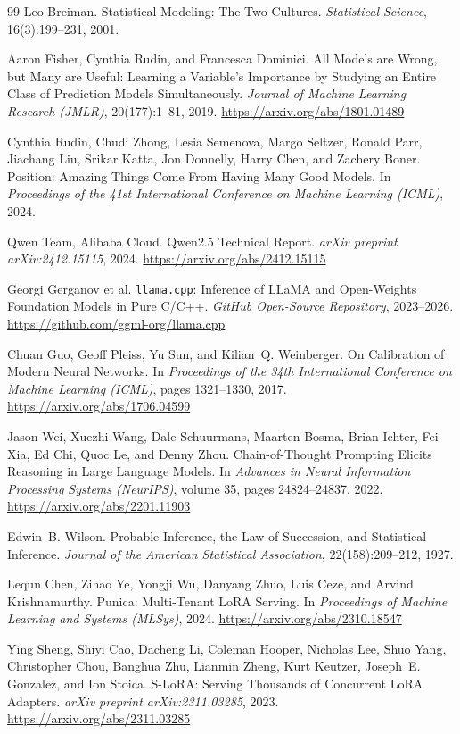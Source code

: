 \documentclass[10pt,a4paper]{article}
\begin{document}
\begin{thebibliography}{99}
Leo Breiman.
\newblock Statistical Modeling: The Two Cultures.
\newblock \emph{Statistical Science}, 16(3):199--231, 2001.

Aaron Fisher, Cynthia Rudin, and Francesca Dominici.
\newblock All Models are Wrong, but Many are Useful: Learning a Variable's Importance by Studying an Entire Class of Prediction Models Simultaneously.
\newblock \emph{Journal of Machine Learning Research (JMLR)}, 20(177):1--81, 2019. \url{https://arxiv.org/abs/1801.01489}

Cynthia Rudin, Chudi Zhong, Lesia Semenova, Margo Seltzer, Ronald Parr, Jiachang Liu, Srikar Katta, Jon Donnelly, Harry Chen, and Zachery Boner.
\newblock Position: Amazing Things Come From Having Many Good Models.
\newblock In \emph{Proceedings of the 41st International Conference on Machine Learning (ICML)}, 2024.

Qwen Team, Alibaba Cloud.
\newblock Qwen2.5 Technical Report.
\newblock \emph{arXiv preprint arXiv:2412.15115}, 2024. \url{https://arxiv.org/abs/2412.15115}

Georgi Gerganov et al.
\newblock \texttt{llama.cpp}: Inference of LLaMA and Open-Weights Foundation Models in Pure C/C++.
\newblock \emph{GitHub Open-Source Repository}, 2023--2026. \url{https://github.com/ggml-org/llama.cpp}

Chuan Guo, Geoff Pleiss, Yu Sun, and Kilian~Q. Weinberger.
\newblock On Calibration of Modern Neural Networks.
\newblock In \emph{Proceedings of the 34th International Conference on Machine Learning (ICML)}, pages 1321--1330, 2017. \url{https://arxiv.org/abs/1706.04599}

Jason Wei, Xuezhi Wang, Dale Schuurmans, Maarten Bosma, Brian Ichter, Fei Xia, Ed Chi, Quoc Le, and Denny Zhou.
\newblock Chain-of-Thought Prompting Elicits Reasoning in Large Language Models.
\newblock In \emph{Advances in Neural Information Processing Systems (NeurIPS)}, volume 35, pages 24824--24837, 2022. \url{https://arxiv.org/abs/2201.11903}

Edwin~B. Wilson.
\newblock Probable Inference, the Law of Succession, and Statistical Inference.
\newblock \emph{Journal of the American Statistical Association}, 22(158):209--212, 1927.

Lequn Chen, Zihao Ye, Yongji Wu, Danyang Zhuo, Luis Ceze, and Arvind Krishnamurthy.
\newblock Punica: Multi-Tenant LoRA Serving.
\newblock In \emph{Proceedings of Machine Learning and Systems (MLSys)}, 2024. \url{https://arxiv.org/abs/2310.18547}

Ying Sheng, Shiyi Cao, Dacheng Li, Coleman Hooper, Nicholas Lee, Shuo Yang, Christopher Chou, Banghua Zhu, Lianmin Zheng, Kurt Keutzer, Joseph~E. Gonzalez, and Ion Stoica.
\newblock S-LoRA: Serving Thousands of Concurrent LoRA Adapters.
\newblock \emph{arXiv preprint arXiv:2311.03285}, 2023. \url{https://arxiv.org/abs/2311.03285}

\end{thebibliography}
\end{document}
